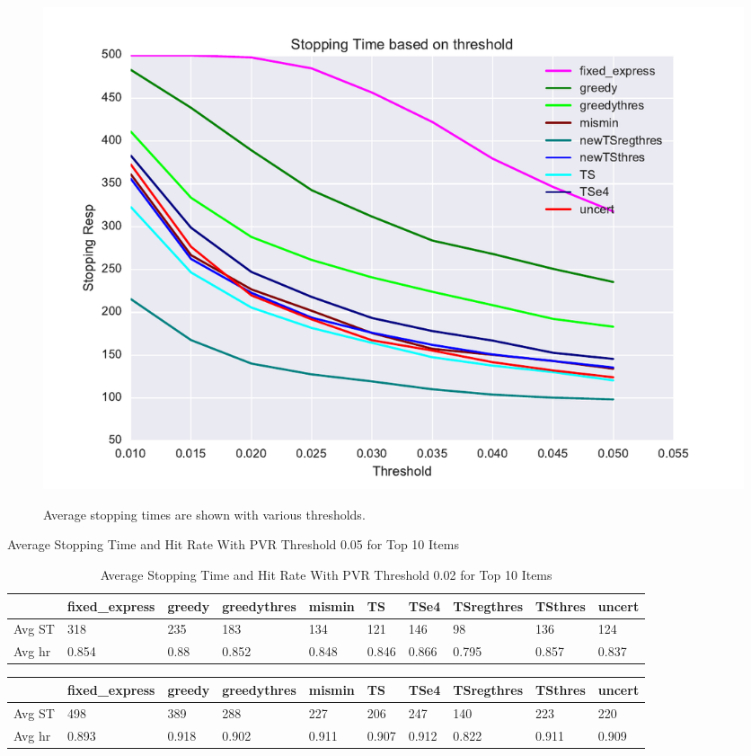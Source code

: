 \documentclass[a4paper,11pt]{article}
\begin{document}
\begin{figure}
\caption{Average stopping times are shown with various thresholds.}
\includegraphics[width=1\textwidth]{plots/stoppingtimes.pdf}
\label{fig:st}
\end{figure}
\begin{table}
\begin{center}
\caption{Average Stopping Time and Hit Rate With PVR Threshold 0.05 for Top 10 Items}
\label{table:st5}
\begin{tabular}{llllllllll}
\hline    &  fixed\_express &  greedy &  greedythres &  mismin &    TS &  TSe4 &  TSregthres &  TSthres &  uncert \\\hline  Avg ST  & 318 &   235 & 183 & 134 & 121 & 146 & 	98 &	136 &   124 \\  Avg hr  &  0.854 &  0.88 & 0.852&0.848 & 0.846 & 	0.866 & 0.795 &0.857 &  0.837 \end{tabular}
\end{center}
\caption{Average Stopping Time and Hit Rate With PVR Threshold 0.02 for Top 10 Items}
\label{table:st2}
\end{table}
\begin{table}
\begin{center}
\begin{tabular}{llllllllll}
\hline    &  fixed\_express &  greedy &  greedythres &  mismin &    TS &  TSe4 &  TSregthres &  TSthres &  uncert \\\hline    Avg ST & 498 & 389 & 288 & 227 & 206 & 247 & 140 &223 &  220 \\ Avg hr & 0.893 &0.918&0.902& 	0.911 & 0.907& 0.912 & 0.822&0.911& 0.909\end{tabular}
\end{center}
\end{table}
\end{document}
